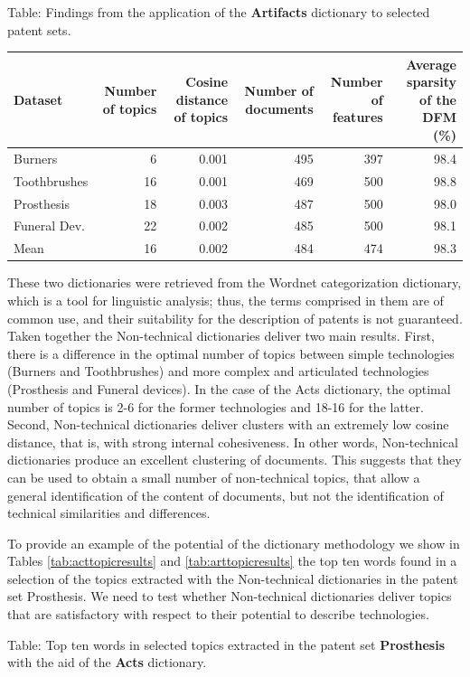 \documentclass[]{book}
\begin{document}
Table: \label{tab:dictartsresults} Findings from the application of the
\textbf{Artifacts} dictionary to selected patent sets.

\begin{tabular}{l|r|r|r|r|r}
\hline
Dataset & Number of topics & Cosine distance of topics & Number of documents & Number of features & Average sparsity of the DFM (\%)\\
\hline
Burners & 6 & 0.001 & 495 & 397 & 98.4\\
\hline
Toothbrushes & 16 & 0.001 & 469 & 500 & 98.8\\
\hline
Prosthesis & 18 & 0.003 & 487 & 500 & 98.0\\
\hline
Funeral Dev. & 22 & 0.002 & 485 & 500 & 98.1\\
\hline
Mean & 16 & 0.002 & 484 & 474 & 98.3\\
\hline
\end{tabular}

These two dictionaries were retrieved from the Wordnet categorization
dictionary, which is a tool for linguistic analysis; thus, the terms
comprised in them are of common use, and their suitability for the
description of patents is not guaranteed. Taken together the
Non-technical dictionaries deliver two main results. First, there is a
difference in the optimal number of topics between simple technologies
(Burners and Toothbrushes) and more complex and articulated technologies
(Prosthesis and Funeral devices). In the case of the Acts dictionary,
the optimal number of topics is 2-6 for the former technologies and
18-16 for the latter. Second, Non-technical dictionaries deliver
clusters with an extremely low cosine distance, that is, with strong
internal cohesiveness. In other words, Non-technical dictionaries
produce an excellent clustering of documents. This suggests that they
can be used to obtain a small number of non-technical topics, that allow
a general identification of the content of documents, but not the
identification of technical similarities and differences.

To provide an example of the potential of the dictionary methodology we
show in Tables \ref{tab:acttopicresults} and \ref{tab:arttopicresults}
the top ten words found in a selection of the topics extracted with the
Non-technical dictionaries in the patent set Prosthesis. We need to test
whether Non-technical dictionaries deliver topics that are satisfactory
with respect to their potential to describe technologies.

Table: \label{tab:acttopicresults} Top ten words in selected topics
extracted in the patent set \textbf{Prosthesis} with the aid of the
\textbf{Acts} dictionary.
\end{document}
